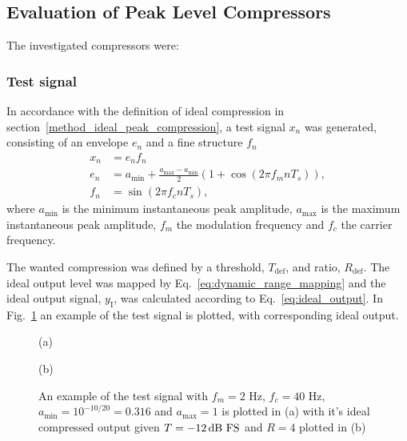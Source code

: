 \documentclass[../main2.tex]{subfiles}
\providecommand{\rootdir}{..}
\begin{document}
\subsection{Evaluation of Peak Level Compressors}\label{method_peak_compressors}
The investigated compressors were:



\subsubsection{Test signal}\label{method_test_signal}
In accordance with the definition of ideal compression in section~\ref{method_ideal_peak_compression}, a test signal $x_n$ was generated, consisting of an envelope $e_n$ and a fine structure $f_n$
\begin{equation}
\begin{split}
	x_n &=e_nf_n\\
	e_n &= a_\text{min} + \frac{a_\text{max}- a_\text{min}}{2} \left(1 + \cos(2 \pi f_m n T_s) \right), \\
	f_n &= \sin(2 \pi f_c n T_s),
\end{split} \label{eq:test_signal}
\end{equation}
where $a_\text{min}$ is the minimum instantaneous peak amplitude, $a_\text{max}$ is the maximum instantaneous peak amplitude, $f_m$ the modulation frequency and $f_c$ the carrier frequency.

The wanted compression was defined by a threshold, $T_\text{def}$, and ratio, $R_\text{def}$. The ideal output level was mapped by Eq.~\eqref{eq:dynamic_range_mapping} and the ideal output signal, $y_\text{I}$, was calculated according to Eq.~\eqref{eq:ideal_output}. In Fig.~\ref{fig:testsignal} an example of the test signal is plotted, with corresponding ideal output.
\begin{figure}[ht]
\captionsetup*{justification=centering}
\begin{minipage}[t]{.5\textwidth}
 \centering

\caption*{(a)} 
\label{fig:param_opt_left}
\end{minipage}%
\begin{minipage}[t]{.5\textwidth}
\centering

\caption*{(b)} 
\label{fig:param_opt_right}
\end{minipage}
\caption{An example of the test signal with $f_m=2$ Hz, $f_c= 40$ Hz, $a_\text{min} = 10^{-10/20}=0.316$ and $a_\text{max} = 1$ is plotted in (a) with it's ideal compressed output given $T=-12 \mskip3mu\text{dB~FS}$ and $R = 4$ plotted in (b)}
\label{fig:testsignal}
\end{figure}
\end{document}
